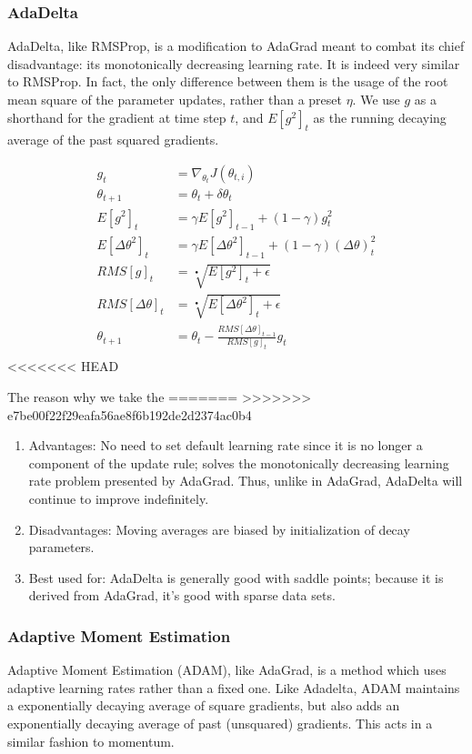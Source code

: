 \documentclass[twoside,11pt]{homework}
\begin{document}
\subsubsection*{AdaDelta}
AdaDelta, like RMSProp, is a modification to AdaGrad meant to combat its chief disadvantage: its monotonically decreasing learning  rate. It is indeed very similar to RMSProp. In fact, the only difference between them is the usage of the root mean square of the parameter updates, rather than a preset $\eta$. We use $g$ as a shorthand for the gradient at time step $t$, and $E[g^2]_t$ as the running decaying average of the past squared gradients. 

\begin{align*}
	g_t &= \nabla_{\theta_t} J(\theta_{t, i})\\
	\theta_{t+1} &= \theta_t + \delta \theta_t\\
	E[g^2]_t &= \gamma E[g^2]_{t-1} + (1-\gamma)g^2_t \\
	E[\Delta \theta^2]_t &= \gamma E[\Delta \theta^2]_{t-1} + (1-\gamma)(\Delta \theta)^2_t \\
	RMS[g]_t &= \sqrt[•]{E[g^2]_t+\epsilon}\\
	RMS[\Delta \theta]_t &= \sqrt[•]{E[\Delta \theta^2]_t+\epsilon}\\
	\theta_{t+1} &= \theta_t - \frac{RMS[\Delta \theta]_{t-1}}{RMS[g]_t} g_t\\
\end{align*}
<<<<<<< HEAD

The reason why we take the 
=======
>>>>>>> e7be00f22f29eafa56ae8f6b192de2d2374ac0b4
\begin{enumerate}
	\item Advantages: No need to set default learning rate since it is no longer a component of the update rule; solves the monotonically decreasing learning rate problem presented by AdaGrad. Thus, unlike in AdaGrad, AdaDelta will continue to improve indefinitely.
	\item Disadvantages: Moving averages are biased by initialization of decay parameters.
	\item Best used for: AdaDelta is generally good with saddle points; because it is derived from AdaGrad, it's good with sparse data sets. 
\end{enumerate}
\subsubsection*{Adaptive Moment Estimation}
Adaptive Moment Estimation (ADAM), like AdaGrad, is a method which uses adaptive learning rates rather than a fixed one. Like Adadelta, ADAM maintains a exponentially decaying average of square gradients, but also adds an exponentially decaying average of past (unsquared) gradients. This acts in a similar fashion to momentum.
\end{document}
